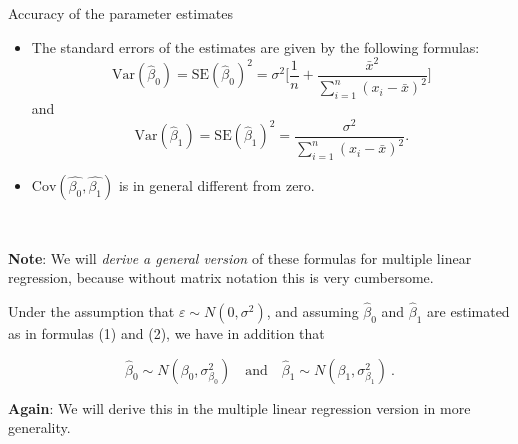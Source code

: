 \documentclass[10pt,ignorenonframetext,]{beamer}
\begin{document}
\begin{frame}

\begin{block}{Accuracy of the parameter estimates}

\vspace{2mm}

\begin{itemize}
\item
  The standard errors of the estimates are given by the following
  formulas:
  \[\text{Var}(\hat{\beta}_0)=\text{SE}(\hat{\beta}_0)^2 = \sigma^2 \Big [ \frac{1}{n} + \frac{\bar{x}^2}{\sum_{i=1}^n (x_i -\bar{x})^2} \Big]\]
  and
  \[\text{Var}(\hat{\beta}_1)=\text{SE}(\hat{\beta}_1)^2 = \frac{\sigma^2}{\sum_{i=1}^n (x_i-\bar{x})^2}.\]
\item
  \(\text{Cov}(\hat{\beta_0},\hat{\beta_1})\) is in general different
  from zero.
\end{itemize}

\(~\) \(~\)

\textbf{Note}: We will \emph{derive a general version} of these formulas
for multiple linear regression, because without matrix notation this is
very cumbersome.

\end{block}

\end{frame}

\begin{frame}

Under the assumption that \(\varepsilon \sim N(0,\sigma^2)\), and
assuming \(\hat\beta_0\) and \(\hat\beta_1\) are estimated as in
formulas (1) and (2), we have in addition that

\[
 \hat\beta_0 \sim N(\beta_0,{\sigma^{2}_{\beta_0}}) \quad \text{and} \quad \hat\beta_1 \sim N(\beta_1,{\sigma^{2}_{\beta_1}}) \ .
\]

\vspace{6mm}

\textbf{Again}: We will derive this in the multiple linear regression
version in more generality.

\end{frame}
\end{document}

